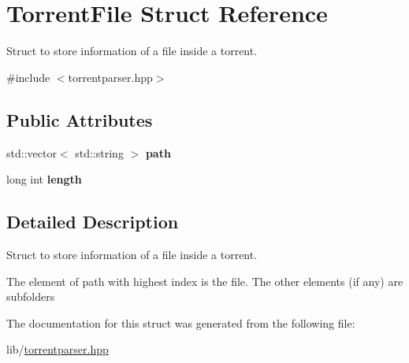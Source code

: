 \hypertarget{structTorrentFile}{}\section{Torrent\+File Struct Reference}
\label{structTorrentFile}


Struct to store information of a file inside a torrent.  




{\ttfamily \#include $<$torrentparser.\+hpp$>$}

\subsection*{Public Attributes}
\begin{DoxyCompactItemize}
\item 
\mbox{\label{structTorrentFile_af01926bfbda73df36e9648d35c973470}} 
std\+::vector$<$ std\+::string $>$ {\bfseries path}
\item 
\mbox{\label{structTorrentFile_a325e8999959721baf05d23b14349dcd7}} 
long int {\bfseries length}
\end{DoxyCompactItemize}


\subsection{Detailed Description}
Struct to store information of a file inside a torrent. 

The element of path with highest index is the file. The other elements (if any) are subfolders 

The documentation for this struct was generated from the following file\+:\begin{DoxyCompactItemize}
\item 
lib/\hyperlink{torrentparser_8hpp}{torrentparser.\+hpp}\end{DoxyCompactItemize}
